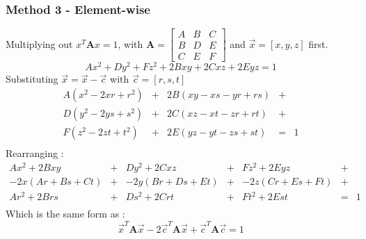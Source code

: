 \documentclass{article}
\def\mat#1{\mathbf{#1}}
\begin{document}
\subsubsection{Method 3 - Element-wise}
Multiplying out $x^T\mat{A}x = 1$, with 
$\mat{A} = \left[ \begin{smallmatrix}
A & B & C \\
B & D & E \\
C & E & F
\end{smallmatrix} \right]$ and $\vec{x}=\left[ x,y,z \right]$ first.
\begin{equation}
Ax^2 + Dy^2 + Fz^2 + 2Bxy + 2Cxz +2Eyz = 1
\end{equation} 
Substituting $\vec{x} = \vec{x}-\vec{c}$ with $\vec{c} = \left[r,s,t\right]$
\begin{equation}
\begin{matrix}
A(x^2 - 2xr + r^2) &+& 2B(xy -xs -yr + rs) &+&\\
D(y^2 - 2ys + s^2) &+& 2C(xz -xt -zr + rt) &+&\\
F(z^2 - 2zt + t^2) &+& 2E(yz -yt -zs + st) &=&1\\
\end{matrix}
\end{equation}
Rearranging :
\begin{equation}
\begin{matrix}
Ax^2 + 2Bxy &+& Dy^2 + 2Cxz &+& Fz^2 + 2Eyz &+& \\
-2x(Ar+Bs+Ct) &+& -2y(Br+Ds+Et) &+& -2z(Cr+Es+Ft) &+&\\
Ar^2+2Brs  &+& Ds^2 + 2Crt &+& Ft^2 + 2Est &=&1  \\
\end{matrix}
\end{equation}
Which is the same form as :
\begin{equation}
\vec{x}^T \mat{A}\vec{x} - 2\vec{c}^T\mat{A}\vec{x} + \vec{c}^T\mat{A}\vec{c} = 1
\end{equation}
\end{document}
